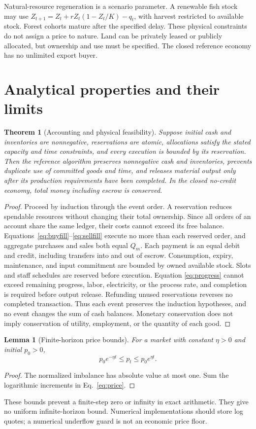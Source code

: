 \documentclass[10pt,a4paper,twocolumn]{article}
\newtheorem{theorem}{Theorem}
\newtheorem{lemma}{Lemma}
\begin{document}
Natural-resource regeneration is a scenario parameter. A renewable fish
stock may use $Z_{t+1}=Z_t+rZ_t(1-Z_t/K)-q_t$, with harvest restricted
to available stock. Forest cohorts mature after the specified delay.
These physical constraints do not assign a price to nature. Land can be
privately leased or publicly allocated, but ownership and use must be
specified. The closed reference economy has no unlimited export buyer.

\section{Analytical properties and their limits}
\begin{theorem}[Accounting and physical feasibility]
Suppose initial cash and inventories are nonnegative, reservations are
atomic, allocations satisfy the stated capacity and time constraints,
and every execution is bounded by its reservation. Then the reference
algorithm preserves nonnegative cash and inventories, prevents duplicate
use of committed goods and time, and releases material output only after
its production requirements have been completed. In the closed
no-credit economy, total money including escrow is conserved.
\end{theorem}
\begin{proof}
Proceed by induction through the event order. A reservation reduces
spendable resources without changing their total ownership. Since all
orders of an account share the same ledger, their costs cannot exceed
its free balance. Equations~\eqref{eq:buyfill}--\eqref{eq:sellfill}
execute no more than each reserved order, and aggregate purchases and
sales both equal $Q_m$. Each payment is an equal debit and credit,
including transfers into and out of escrow. Consumption, expiry,
maintenance, and input commitment are bounded by owned available stock.
Slots and staff schedules are reserved before execution. Equation
\eqref{eq:progress} cannot exceed remaining progress, labor, electricity,
or the process rate, and completion is required before output release.
Refunding unused reservations reverses no completed transaction. Thus
each event preserves the induction hypotheses, and no event changes
the sum of cash balances. Monetary conservation does not imply
conservation of utility, employment, or the quantity of each good.
\end{proof}

\begin{lemma}[Finite-horizon price bounds]
For a market with constant $\eta>0$ and initial $p_0>0$,
\begin{equation}
 p_0e^{-\eta t}\leq p_t\leq p_0e^{\eta t}.
\end{equation}
\end{lemma}
\begin{proof}
The normalized imbalance has absolute value at most one. Sum the
logarithmic increments in Eq.~\eqref{eq:price}.
\end{proof}
These bounds prevent a finite-step zero or infinity in exact arithmetic.
They give no uniform infinite-horizon bound. Numerical implementations
should store log quotes; a numerical underflow guard is not an economic
price floor.
\end{document}
